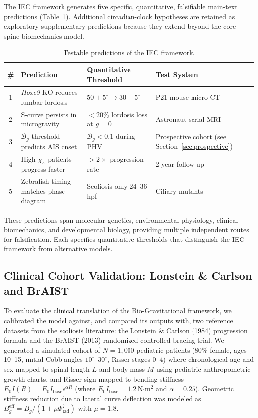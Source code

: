 The IEC framework generates five specific, quantitative, falsifiable main-text predictions (Table~\ref{tab:predictions}). Additional circadian-clock hypotheses are retained as exploratory supplementary predictions because they extend beyond the core spine-biomechanics model.

\begin{table}[h!]
\centering
\caption{Testable predictions of the IEC framework.}
\label{tab:predictions}
\small
\begin{tabular}{clll}
\toprule
\textbf{\#} & \textbf{Prediction} & \textbf{Quantitative Threshold} & \textbf{Test System} \\
\midrule
1 & \textit{Hoxc9} KO reduces lumbar lordosis & $50 \pm 5^\circ \to 30 \pm 5^\circ$ & P21 mouse micro-CT \\
2 & S-curve persists in microgravity & $<20\%$ lordosis loss at $g = 0$ & Astronaut serial MRI \\
3 & $\mathcal{B}_g$ threshold predicts AIS onset & $\mathcal{B}_g < 0.1$ during PHV & Prospective cohort (see Section~\ref{sec:prospective}) \\
4 & High-$\chi_\kappa$ patients progress faster & $>2\times$ progression rate & 2-year follow-up \\
5 & Zebrafish timing matches phase diagram & Scoliosis only 24--36 hpf & Ciliary mutants \\
\bottomrule
\end{tabular}
\end{table}

These predictions span molecular genetics, environmental physiology, clinical biomechanics, and developmental biology, providing multiple independent routes for falsification. Each specifies quantitative thresholds that distinguish the IEC framework from alternative models.

\subsection{Clinical Cohort Validation: Lonstein \& Carlson and BrAIST}

To evaluate the clinical translation of the Bio-Gravitational framework, we calibrated the model against, and compared its outputs with, two reference datasets from the scoliosis literature: the Lonstein \& Carlson (1984) progression formula and the BrAIST (2013) randomized controlled bracing trial. We generated a simulated cohort of $N=1,000$ pediatric patients (80\% female, ages 10--15, initial Cobb angles $10^\circ$--$30^\circ$, Risser stages 0--4) where chronological age and sex mapped to spinal length $L$ and body mass $M$ using pediatric anthropometric growth charts, and Risser sign mapped to bending stiffness $E_0 I(R) = E_0 I_{\mathrm{base}} e^{\alpha R}$ (where $E_0 I_{\mathrm{base}} = 1.2$\,N$\cdot$m$^2$ and $\alpha = 0.25$). Geometric stiffness reduction due to lateral curve deflection was modeled as $B_g^{\mathrm{eff}} = B_g / (1 + \mu \Phi_{\mathrm{rad}}^2)$ with $\mu = 1.8$.

